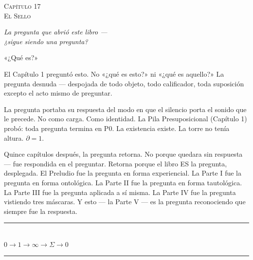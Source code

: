 \documentclass[10pt, openany, oneside]{book}
\renewcommand{\normalsize}{\fontsize{10}{13}\selectfont}
\renewcommand{\large}{\fontsize{11.5}{14}\selectfont}
\renewcommand{\huge}{\fontsize{17}{21}\selectfont}
\begin{document}
\newpage

\begin{center}
    {\huge\scshape Capítulo 17}\\[0.3em]
    {\large\scshape El Sello}
\end{center}

\vspace{1.5em}

\begin{center}
    \itshape
    La pregunta que abrió este libro ---\\
    ¿sigue siendo una pregunta?
\end{center}

\vspace{2em}


\noindent «¿Qué es?»

El Capítulo 1 preguntó esto. No «¿qué es esto?» ni «¿qué es aquello?» La pregunta desnuda --- despojada de todo objeto, todo calificador, toda suposición excepto el acto mismo de preguntar.

La pregunta portaba su respuesta del modo en que el silencio porta el sonido que le precede. No como carga. Como identidad. La Pila Presuposicional (Capítulo 1) probó: toda pregunta termina en P0. La existencia existe. La torre no tenía altura. $\partial = 1$.

Quince capítulos después, la pregunta retorna. No porque quedara sin respuesta --- fue respondida en el preguntar. Retorna porque el libro ES la pregunta, desplegada. El Preludio fue la pregunta en forma experiencial. La Parte I fue la pregunta en forma ontológica. La Parte II fue la pregunta en forma tautológica. La Parte III fue la pregunta aplicada a sí misma. La Parte IV fue la pregunta vistiendo tres máscaras. Y esto --- la Parte V --- es la pregunta reconociendo que siempre fue la respuesta.

\vspace{1.5em}


\begin{center}
    \rule{0.3\textwidth}{0.4pt}\\[0.5em]
    {\normalsize\bfseries\scshape $0 \to 1 \to \infty \to \Sigma \to 0$}\\[0.3em]
    \rule{0.3\textwidth}{0.4pt}
\end{center}
\end{document}
